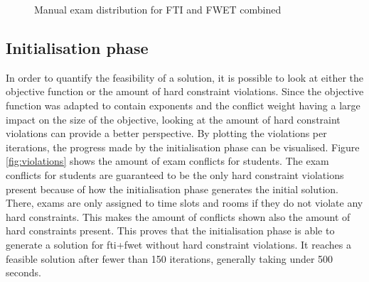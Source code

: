 \begin{figure}[H]
  \centering
  \hfill
  \caption{Manual exam distribution for FTI and FWET combined}
  \label{fig:manual_combined}
\end{figure}


\subsection{Initialisation phase} \label{phase_init}

In order to quantify the feasibility of a solution, it is possible to look at either the objective function or the amount of hard constraint violations. Since the objective function was adapted to contain exponents and the conflict weight having a large impact on the size of the objective, looking at the amount of hard constraint violations can provide a better perspective. By plotting the violations per iterations, the progress made by the initialisation phase can be visualised. Figure \ref{fig:violations} shows the amount of exam conflicts for students. The exam conflicts for students are guaranteed to be the only hard constraint violations present because of how the initialisation phase generates the initial solution. There, exams are only assigned to time slots and rooms if they do not violate any hard constraints. This makes the amount of conflicts shown also the amount of hard constraints present. This proves that the initialisation phase is able to generate a solution for \acrshort{fti}+\acrshort{fwet} without hard constraint violations. It reaches a feasible solution after fewer than 150 iterations, generally taking under 500 seconds. 

